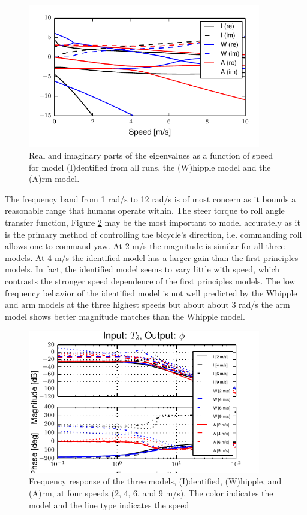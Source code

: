 \documentclass[a4paper]{article}
\begin{document}
\begin{figure}
  \centering
  \includegraphics[width=4in]{figures/L-P-eig.pdf}
  \caption{Real and imaginary parts of the eigenvalues as a function of speed
    for model (I)dentified from all runs, the (W)hipple model and the (A)rm
    model.}
  \label{fig:L-P-eig}
\end{figure}

The frequency band from 1 rad/s to 12 rad/s is of most concern as it bounds a
reasonable range that humans operate within. The steer torque
to roll angle transfer function, Figure \ref{fig:L-P-Tdel-Phi} may be the most
important to model accurately as it is the primary method of controlling the
bicycle's direction, i.e. commanding roll allows one to command yaw. At 2 m/s
the magnitude is similar for all three models. At 4 m/s the identified model
has a larger gain than the first principles models. In fact, the identified
model seems to vary little with speed, which contrasts the stronger speed
dependence of the first principles models. The low frequency behavior of the
identified model is not well predicted by the Whipple and arm models at the
three highest speeds but about about 3 rad/s the arm model shows better
magnitude matches than the Whipple model.

\begin{figure}
  \centering
  \includegraphics[width=4in]{figures/L-P-Tdel-Phi.pdf}
  \caption{Frequency response of the three models, (I)dentified, (W)hipple, and
    (A)rm, at four speeds (2, 4, 6, and 9 m/s). The color indicates the model
    and the line type indicates the speed}
  \label{fig:L-P-Tdel-Phi}
\end{figure}
\end{document}
